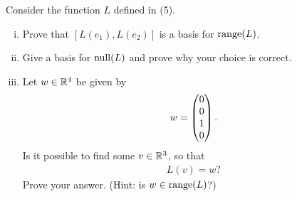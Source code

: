 \begin{question}\label{que:RangeAndNullMatrixL}
	\normalfont
	
	Consider the function $L$ defined in (5).
	
	\begin{enumerate}[(i)]
		\item Prove that $[L(e_1), L(e_2)]$ is a basis for $\textnormal{range}(L)$.
		
		\item Give a basis for $\textnormal{null}(L)$ and prove why your choice is correct.
		
		\item Let $w\in{\mathbb R}^4$ be given by
		\begin{align*}
			w = \begin{pmatrix} 0\\ 0\\1 \\ 0\end{pmatrix}.
		\end{align*}
		Is it possible to find some $v\in{\mathbb R}^3$, so that
		\begin{align*}
			L(v)=w?
		\end{align*}
		Prove your answer. (Hint: is $w\in\textnormal{range}(L)$?)
	\end{enumerate}
\end{question}
